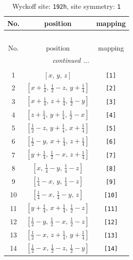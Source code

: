 \documentclass[fleqn,8pt]{jsarticle}
\begin{document}
\renewcommand{\arraystretch}{1.2}
\begin{longtable}{ccc}
\caption{Wyckoff site: {\tt 192h}, site symmetry: {\tt 1}}
 \\
 \hline \hline
No. & position & mapping \\ \hline \endfirsthead

\multicolumn{2}{l}{\tablename\ \thetable{}} \\
 \hline \hline
No. & position & mapping \\ \hline \endhead

 \hline \hline
\multicolumn{2}{r}{\footnotesize\it continued ...} \\ \endfoot

 \hline \hline
\multicolumn{2}{r}{} \\ \endlastfoot

1 & $\left[ x,\, y,\, z \right]$ & {\tt [1]} \\ \hline
2 & $\left[ x + \frac{1}{4},\, \frac{1}{2} - z,\, y + \frac{1}{4} \right]$ & {\tt [2]} \\ \hline
3 & $\left[ x + \frac{1}{4},\, z + \frac{1}{4},\, \frac{1}{2} - y \right]$ & {\tt [3]} \\ \hline
4 & $\left[ z + \frac{1}{4},\, y + \frac{1}{4},\, \frac{1}{2} - x \right]$ & {\tt [4]} \\ \hline
5 & $\left[ \frac{1}{2} - z,\, y + \frac{1}{4},\, x + \frac{1}{4} \right]$ & {\tt [5]} \\ \hline
6 & $\left[ \frac{1}{2} - y,\, x + \frac{1}{4},\, z + \frac{1}{4} \right]$ & {\tt [6]} \\ \hline
7 & $\left[ y + \frac{1}{4},\, \frac{1}{2} - x,\, z + \frac{1}{4} \right]$ & {\tt [7]} \\ \hline
8 & $\left[ x,\, \frac{1}{4} - y,\, \frac{1}{4} - z \right]$ & {\tt [8]} \\ \hline
9 & $\left[ \frac{1}{4} - x,\, y,\, \frac{1}{4} - z \right]$ & {\tt [9]} \\ \hline
10 & $\left[ \frac{1}{4} - x,\, \frac{1}{4} - y,\, z \right]$ & {\tt [10]} \\ \hline
11 & $\left[ y + \frac{1}{4},\, x + \frac{1}{4},\, \frac{1}{2} - z \right]$ & {\tt [11]} \\ \hline
12 & $\left[ \frac{1}{2} - y,\, \frac{1}{2} - x,\, \frac{1}{2} - z \right]$ & {\tt [12]} \\ \hline
13 & $\left[ \frac{1}{2} - x,\, z + \frac{1}{4},\, y + \frac{1}{4} \right]$ & {\tt [13]} \\ \hline
14 & $\left[ \frac{1}{2} - x,\, \frac{1}{2} - z,\, \frac{1}{2} - y \right]$ & {\tt [14]} \\ \hline

\end{longtable}
\end{document}
